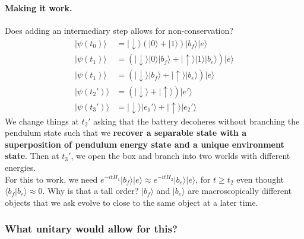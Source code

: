 \documentclass{article}
\begin{document}
\paragraph{Making it work.} Does adding an intermediary step allows for non-conservation?
\begin{align}
    |\psi(t_0)\rangle&=|\downarrow\rangle(|0\rangle+|1\rangle)|b_f\rangle|e\rangle\\
    |\psi(t_1)\rangle&=(|\downarrow\rangle|0\rangle|b_f\rangle+|\uparrow\rangle|1\rangle|b_e\rangle)|e\rangle\\
    |\psi(t_1)\rangle&=(|\downarrow\rangle|b_f\rangle+|\uparrow\rangle|b_e\rangle)|e\rangle\\
    |\psi(t_2')\rangle&=(|\downarrow\rangle+|\uparrow\rangle)|e'\rangle\\
    |\psi(t_3')\rangle&=|\downarrow\rangle|e_1'\rangle+|\uparrow\rangle|e_2'\rangle
\end{align}
We change things at $t_2'$ asking that the battery decoheres without branching the pendulum state such that we \textbf{recover a separable state with a superposition of pendulum energy state and a unique environment state}. Then at $t_3'$, we open the box and branch into two worlds with different energies.\\

For this to work, we need $e^{-itH_1}|b_f\rangle|e\rangle\approx e^{-itH_2}|b_e\rangle|e\rangle$, for $t\geq t_2$ even thought $\langle b_f|b_e\rangle\approx0$. Why is that a tall order? $|b_f\rangle$ and $|b_e\rangle$ are macroscopically different objects that we ask evolve to close to the same object at a later time.

\subsubsection{What unitary would allow for this?}
\end{document}

